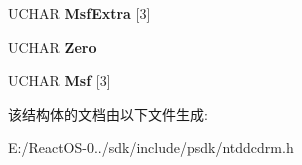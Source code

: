 \begin{DoxyCompactItemize}
U\+C\+H\+AR {\bfseries Msf\+Extra} \mbox{[}3\mbox{]}
\item 
\mbox{\label{struct___c_d_r_o_m___t_o_c___f_u_l_l___t_o_c___d_a_t_a___b_l_o_c_k_a2b9f915bb3a1a67863a6b1d013ee9366}} 
U\+C\+H\+AR {\bfseries Zero}
\item 
\mbox{\label{struct___c_d_r_o_m___t_o_c___f_u_l_l___t_o_c___d_a_t_a___b_l_o_c_k_a417ee7d1ffe4b52377479a3ecfc7503d}} 
U\+C\+H\+AR {\bfseries Msf} \mbox{[}3\mbox{]}
\end{DoxyCompactItemize}


该结构体的文档由以下文件生成\+:\begin{DoxyCompactItemize}
\item 
E\+:/\+React\+O\+S-\/0../sdk/include/psdk/ntddcdrm.\+h\end{DoxyCompactItemize}
